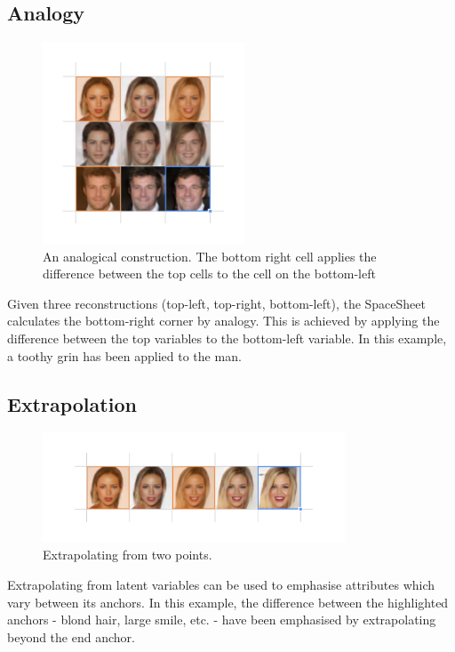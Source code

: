 \documentclass[letterpaper]{article}
\begin{document}
\subsection{Analogy}
\begin{figure}[ht!]
  \centering
  \includegraphics[width=6cm]{figs/07-analogy.jpg}
  \caption{An analogical construction. The bottom right cell applies the difference between the top cells to the cell on the bottom-left}
\end{figure}

Given three reconstructions (top-left, top-right, bottom-left), the SpaceSheet calculates the bottom-right corner by analogy. This is achieved by applying the difference between the top variables to the bottom-left variable. In this example, a toothy grin has been applied to the man.

\subsection{Extrapolation}
\begin{figure}[ht!]
  \centering
  \includegraphics[width=9cm]{figs/08-extrapolation.jpg}
  \caption{Extrapolating from two points.}
\end{figure}

Extrapolating from latent variables can be used to emphasise attributes which vary between its anchors. In this example, the difference between the highlighted anchors - blond hair, large smile, etc.  - have been emphasised by extrapolating beyond the end anchor.
\end{document}
